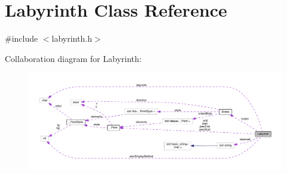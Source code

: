 \hypertarget{class_labyrinth}{}\section{Labyrinth Class Reference}
\label{class_labyrinth}


{\ttfamily \#include $<$labyrinth.\+h$>$}



Collaboration diagram for Labyrinth\+:
\nopagebreak
\begin{figure}[H]
\begin{center}
\leavevmode
\includegraphics[width=350pt]{class_labyrinth__coll__graph}
\end{center}
\end{figure}
